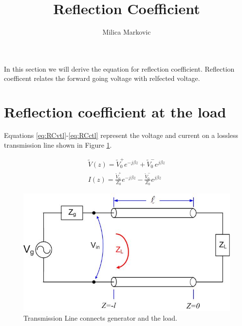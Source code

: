 \documentclass{ximera}
\title{Reflection Coefficient}
\author{Milica Markovic}
\begin{document}
  
\begin{abstract}  

\end{abstract}  
\maketitle    



In this section we will derive the equation for reflection coefficient. Reflection coefficent relates the forward going voltage with relfected voltage.

\section{Reflection coefficient at the load}

Equations \ref{eq:RCvtl}-\ref{eq:RCctl} represent the voltage and current on a lossless transmission line shown in Figure \ref{fig:RCTLCircuit}.

\begin{eqnarray}
\tilde{V}(z)=\tilde{V}_0^+ e^{-j \beta z} +\tilde{V}_0^- e^{j \beta z} \label{eq:RCvtl} \\ 
I(z)=\frac{\tilde{V}_0^+}{Z_0} e^{- j \beta z} - \frac{\tilde{V}_0^-}{Z_0} e^{j \beta z}\label{eq:RCctl}
\end{eqnarray}



\begin{figure}[htbp]
\begin{center}
\includegraphics[scale=0.3]{../jpg/trline.jpg}
\end{center}
\caption{Transmission Line connects generator and the load.}
\label{fig:RCTLCircuit}
\end{figure}
\end{document}
